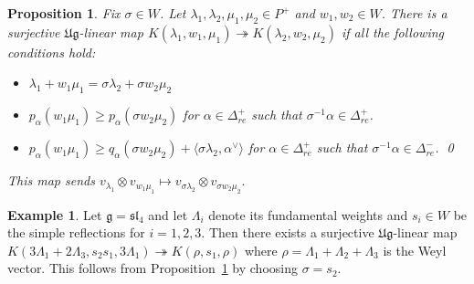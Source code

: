 \documentclass[12pt,reqno]{amsart}
\theoremstyle{plain}
\newtheorem{proposition}[theorem]{Proposition}
\theoremstyle{definition}
\newtheorem{example}[theorem]{Example}
\theoremstyle{remark}
\theoremstyle{plain}
\newcommand{\lie}{\mathfrak}
\begin{document}
\begin{proposition}\label{prop:sigma}
 Fix $\sigma \in W$. Let $\lambda_1, \lambda_2, \mu_1, \mu_2 \in P^+$ and $w_1, w_2 \in W$. There is a surjective $\lie{Ug}$-linear map $K(\lambda_1,w_1,\mu_1) \twoheadrightarrow K(\lambda_2,w_2,\mu_2)$ if all the following conditions hold: 
    \begin{itemize}
        \item $\lambda_1+w_1\mu_1=\sigma\lambda_2+\sigma w_2\mu_2$
        \item  $p_\alpha(w_1\mu_1)\geq p_\alpha(\sigma w_2\mu_2)$ for  $\alpha\in \Delta_{re}^+$ such that $\sigma^{-1}\alpha\in \Delta_{re}^+$.
        \item $p_\alpha(w_1\mu_1) \geq  q_\alpha(\sigma w_2\mu_2) + \langle\sigma \lambda_2,\alpha^\vee\rangle$ for $\alpha\in \Delta_{re}^+$ such that $\sigma^{-1}\alpha\in \Delta_{re}^-$.  \qed
            \end{itemize} 
            This map sends $v_{\lambda_1} \otimes v_{w_1\mu_1} \mapsto v_{\sigma\lambda_2} \otimes v_{\sigma w_2\mu_2}.$
\end{proposition}

\begin{example}
Let $\lie g = \lie{sl}_4$ and let $\Lambda_i$ denote its fundamental weights and $s_i \in W$
be the simple reflections for $i=1, 2, 3$. Then there exists a surjective $\lie{Ug}$-linear map $K(3\Lambda_1+2\Lambda_3, s_2s_1,3\Lambda_1) \twoheadrightarrow K(\rho, s_1, \rho)$ where $\rho = \Lambda_1 + \Lambda_2 + \Lambda_3$ is the Weyl vector. This follows from Proposition~\ref{prop:sigma} by choosing $\sigma = s_2$. 
\end{example} 
 
\end{document}
